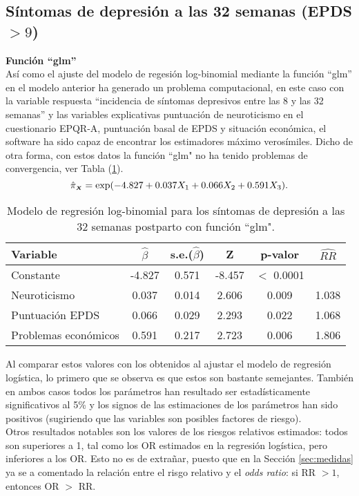 \subsection{Síntomas de depresión a las 32 semanas (EPDS$>9$)}
 \textbf{Función ``glm''}\\
[0.3cm]
Así como el ajuste del modelo de regesión log-binomial mediante la función ``glm'' en el modelo anterior ha generado un problema computacional, en este caso con la variable respuesta ``incidencia de síntomas depresivos entre las 8 y las 32 semanas'' y las variables explicativas puntuación de neuroticismo en el cuestionario EPQR-A, puntuación basal de EPDS y situación económica, el software ha sido capaz de encontrar los estimadores máximo verosímiles. Dicho de otra forma, con estos datos la función ``glm" no ha tenido problemas de convergencia, ver Tabla (\ref{tab:13}).
\begin{equation*}
\hat{\pi}_{\mathsmaller{\boldsymbol{X}}}=\exp(-4.827+0.037X_1+0.066X_2+0.591X_3).
\end{equation*}

\begin{table} [H]
	\centering
	\begin{tabular}{l c c c c c}
		\toprule
		\textbf{Variable} & $\hat{\beta}$ & s.e.($\hat{\beta}$) & Z & p-valor & $\widehat{RR}$\\
		\midrule
		Constante & -4.827  &  0.571 & -8.457 & $<$ 0.0001 &  \\
		Neuroticismo& 0.037  &  0.014&  2.606 & 0.009& 1.038  \\
		Puntuación EPDS &  0.066  &  0.029 &  2.293 & 0.022& 1.068\\
		Problemas económicos &  0.591 &   0.217  & 2.723 & 0.006 &1.806 \\
		\bottomrule
	\end{tabular}
	\caption{Modelo de regresión log-binomial para los síntomas de depresión a las 32 semanas postparto con función ``glm".}
	\label{tab:13}
\end{table}

Al comparar estos valores con los obtenidos al ajustar el modelo de regresión logística, lo primero que se observa es que estos son bastante semejantes. También en ambos casos todos los parámetros han resultado ser estadísticamente significativos al 5\% y los signos de las estimaciones de los parámetros han sido positivos (sugiriendo que las variables son posibles factores de riesgo).\\

Otros resultados notables son los valores de los riesgos relativos estimados: todos son superiores a 1, tal como los OR estimados en la regresión logística, pero inferiores a los OR. Esto no es de extrañar, puesto que en la Sección \ref{sec:medidas} ya se a comentado la relación entre el risgo relativo y el \textit{odds ratio}: si RR $>1$, entonces OR $>$ RR.\\ 

